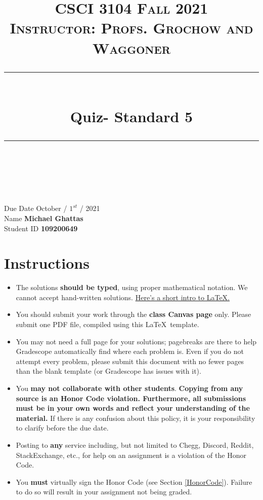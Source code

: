\documentclass[11pt]{article}
\title{
\normalfont \normalsize 
\textsc{CSCI 3104 Fall 2021 \\ 
Instructor: Profs. Grochow and Waggoner} \\
[10pt] 
\rule{\linewidth}{0.5pt} \\[6pt] 
\huge Quiz- Standard 5 \\
\rule{\linewidth}{2pt}  \\[10pt]
}
\date{}
\theoremstyle{definition}
\theoremstyle{definition}
\theoremstyle{definition}
\begin{document}
\maketitle


\noindent
Due Date \dotfill October / $1^{st}$ / 2021 \\
Name \dotfill \textbf{Michael Ghattas} \\
Student ID \dotfill \textbf{109200649} \\


\tableofcontents

\section{Instructions}
 \begin{itemize}
	\item The solutions \textbf{should be typed}, using proper mathematical notation. We cannot accept hand-written solutions. \href{http://ece.uprm.edu/~caceros/latex/introduction.pdf}{Here's a short intro to \LaTeX.}
	\item You should submit your work through the \textbf{class Canvas page} only. Please submit one PDF file, compiled using this \LaTeX \ template.
	\item You may not need a full page for your solutions; pagebreaks are there to help Gradescope automatically find where each problem is. Even if you do not attempt every problem, please submit this document with no fewer pages than the blank template (or Gradescope has issues with it).

	\item You \textbf{may not collaborate with other students}. \textbf{Copying from any source is an Honor Code violation. Furthermore, all submissions must be in your own words and reflect your understanding of the material.} If there is any confusion about this policy, it is your responsibility to clarify before the due date. 

	\item Posting to \textbf{any} service including, but not limited to Chegg, Discord, Reddit, StackExchange, etc., for help on an assignment is a violation of the Honor Code.

	\item You \textbf{must} virtually sign the Honor Code (see Section \ref{HonorCode}). Failure to do so will result in your assignment not being graded.
\end{itemize}
\end{document}
